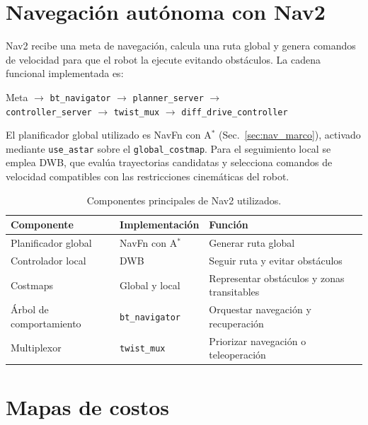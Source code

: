 \section{Navegación autónoma con Nav2}
\label{sec:nav2_ch9}
Nav2 recibe una meta de navegación, calcula una ruta global y genera comandos de velocidad para que el robot la ejecute evitando obstáculos. La cadena funcional implementada es:

\begin{center}
\small
\begin{minipage}{\linewidth}
\centering
Meta $\rightarrow$ \texttt{bt\_navigator} $\rightarrow$ \texttt{planner\_server} $\rightarrow$ \\[3pt]
\texttt{controller\_server} $\rightarrow$ \texttt{twist\_mux} $\rightarrow$ \texttt{diff\_drive\_controller}
\end{minipage}
\end{center}

El planificador global utilizado es NavFn con A$^*$ (Sec.~\ref{sec:nav_marco}), activado mediante \texttt{use\_astar} sobre el \texttt{global\_costmap}. Para el seguimiento local se emplea DWB, que evalúa trayectorias candidatas y selecciona comandos de velocidad compatibles con las restricciones cinemáticas del robot.

\begin{table}[H]
\centering
\caption{Componentes principales de Nav2 utilizados.}
\label{tab:nav2_componentes_ch9}
\small
\begin{tabular}{llp{6.5cm}}
\toprule
\textbf{Componente} & \textbf{Implementación} & \textbf{Función} \\
\midrule
Planificador global & NavFn con A$^*$ & Generar ruta global \\
Controlador local & DWB & Seguir ruta y evitar obstáculos \\
Costmaps & Global y local & Representar obstáculos y zonas transitables \\
Árbol de comportamiento & \texttt{bt\_navigator} & Orquestar navegación y recuperación \\
Multiplexor & \texttt{twist\_mux} & Priorizar navegación o teleoperación \\
\bottomrule
\end{tabular}
\end{table}

\section{Mapas de costos}
\label{sec:costmaps_ch9}

